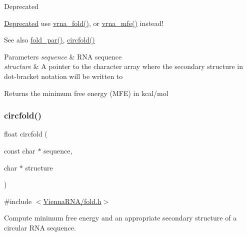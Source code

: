 \begin{DoxyRefDesc}{Deprecated}
\item[\hyperlink{deprecated__deprecated000069}{Deprecated}]use \hyperlink{group__mfe__fold__single_ga29a33b2895f4e67b0480271ff289afdc}{vrna\+\_\+fold()}, or \hyperlink{group__mfe__fold_gabd3b147371ccf25c577f88bbbaf159fd}{vrna\+\_\+mfe()} instead!\end{DoxyRefDesc}


\begin{DoxySeeAlso}{See also}
\hyperlink{group__mfe__fold__single_ga2bc41df5d71fee6fd8da9904ee65d8fb}{fold\+\_\+par()}, \hyperlink{group__mfe__fold__single_ga4ac63ab3e8d9a80ced28b8052d94e423}{circfold()}
\end{DoxySeeAlso}

\begin{DoxyParams}{Parameters}
{\em sequence} & R\+NA sequence \\
\hline
{\em structure} & A pointer to the character array where the secondary structure in dot-\/bracket notation will be written to \\
\hline
\end{DoxyParams}
\begin{DoxyReturn}{Returns}
the minimum free energy (M\+FE) in kcal/mol 
\end{DoxyReturn}
\mbox{\label{group__mfe__fold__single_ga4ac63ab3e8d9a80ced28b8052d94e423}} 
\subsubsection{\texorpdfstring{circfold()}{circfold()}}
{\footnotesize\ttfamily float circfold (\begin{DoxyParamCaption}\item[{const char $\ast$}]{sequence,  }\item[{char $\ast$}]{structure }\end{DoxyParamCaption})}



{\ttfamily \#include $<$\hyperlink{fold_8h}{Vienna\+R\+N\+A/fold.\+h}$>$}



Compute minimum free energy and an appropriate secondary structure of a circular R\+NA sequence. 

